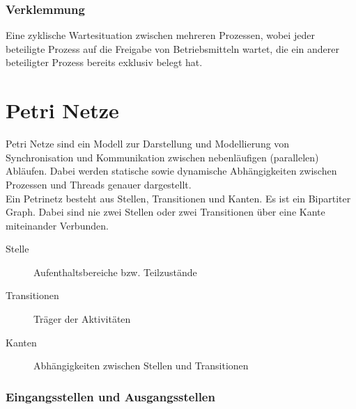 \documentclass[10pt,a4paper]{article}
\begin{document}
\begin{multicols*}{4}
\subsubsection*{Verklemmung}
Eine zyklische Wartesituation zwischen mehreren Prozessen, wobei jeder beteiligte Prozess auf die Freigabe von
Betriebsmitteln wartet, die ein anderer beteiligter Prozess bereits exklusiv belegt hat.
\section{Petri Netze}
Petri Netze sind ein Modell zur Darstellung und Modellierung von Synchronisation und Kommunikation zwischen
nebenläufigen (parallelen) Abläufen. Dabei werden statische sowie dynamische Abhängigkeiten zwischen Prozessen und
Threads genauer dargestellt.\\
Ein Petrinetz besteht aus Stellen, Transitionen und Kanten. Es ist ein Bipartiter Graph. Dabei sind nie zwei Stellen
oder zwei Transitionen über eine Kante miteinander Verbunden.

\begin{description}
	\item[Stelle] Aufenthaltsbereiche bzw. Teilzustände
	\item[Transitionen] Träger der Aktivitäten
	\item[Kanten] Abhängigkeiten zwischen Stellen und Transitionen
\end{description}

\subsubsection*{Eingangsstellen und Ausgangsstellen}

\end{multicols*}
\end{document}
